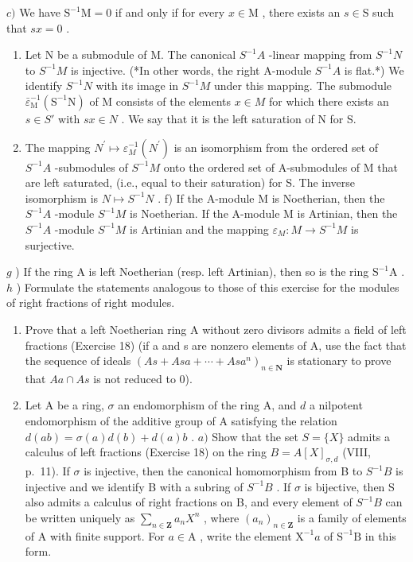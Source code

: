 \(c)\) We have \(\mathrm{S}^{-1}\mathrm{M} = 0\) if and only if for every \(x\in \mathrm{M}\) , there exists an \(s\in \mathrm{S}\) such that \(sx = 0\) .

\begin{enumerate}
\def\labelenumi{\alph{enumi})}
\setcounter{enumi}{3}
\item
  Let N be a submodule of M. The canonical \(S^{-1}A\) -linear mapping from \(S^{-1}N\) to \(S^{-1}M\) is injective. (*In other words, the right A-module \(S^{-1}A\) is flat.*) We identify \(S^{-1}N\) with its image in \(S^{-1}M\) under this mapping. The submodule \(\bar{\varepsilon}_{\mathrm{M}}^{-1}(\mathrm{S}^{-1}\mathrm{N})\) of M consists of the elements \(x \in M\) for which there exists an \(s \in S'\) with \(sx \in N\) . We say that it is the left saturation of N for S.
\item
  The mapping \(N^{\prime} \mapsto \varepsilon_{M}^{-1}(N^{\prime})\) is an isomorphism from the ordered set of \(S^{-1}A\) -submodules of \(S^{-1}M\) onto the ordered set of A-submodules of M that are left saturated, (i.e., equal to their saturation) for S. The inverse isomorphism is \(N \mapsto S^{-1}N\) . f) If the A-module M is Noetherian, then the \(S^{-1}A\) -module \(S^{-1}M\) is Noetherian. If the A-module M is Artinian, then the \(S^{-1}A\) -module \(S^{-1}M\) is Artinian and the mapping \(\varepsilon_{M}: M \to S^{-1}M\) is surjective.
\end{enumerate}

\(g\) ) If the ring A is left Noetherian (resp. left Artinian), then so is the ring \(\mathrm{S}^{-1}\mathrm{A}\) . \(h\) ) Formulate the statements analogous to those of this exercise for the modules of right fractions of right modules.

\begin{enumerate}
\def\labelenumi{\arabic{enumi})}
\setcounter{enumi}{19}
\item
  Prove that a left Noetherian ring A without zero divisors admits a field of left fractions (Exercise 18) (if a and s are nonzero elements of A, use the fact that the sequence of ideals \((As + Asa + \cdots + Asa^{n})_{n \in \mathbf{N}}\) is stationary to prove that \(Aa \cap As\) is not reduced to 0).
\item
  Let A be a ring, \(\sigma\) an endomorphism of the ring A, and \(d\) a nilpotent endomorphism of the additive group of A satisfying the relation \(d(ab) = \sigma(a)d(b) + d(a)b\) . \(a)\) Show that the set \(S = \{X\}\) admits a calculus of left fractions (Exercise 18) on the ring \(B = A[X]_{\sigma,d}\) (VIII, p.~11). If \(\sigma\) is injective, then the canonical homomorphism from B to \(S^{-1}B\) is injective and we identify B with a subring of \(S^{-1}B\) . If \(\sigma\) is bijective, then S also admits a calculus of right fractions on B, and every element of \(S^{-1}B\) can be written uniquely as \(\sum_{n\in\mathbf{Z}}a_nX^n\) , where \((a_n)_{n\in\mathbf{Z}}\) is a family of elements of A with finite support. For \(a \in \mathrm{A}\) , write the element \(\mathrm{X}^{-1}a\) of \(\mathrm{S}^{-1}\mathrm{B}\) in this form.
\end{enumerate}

